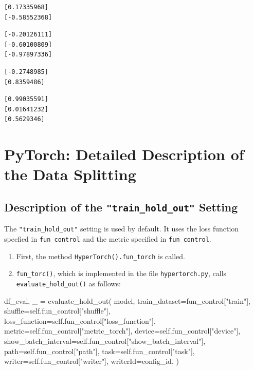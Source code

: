 \documentclass[
  letterpaper,
  DIV=11,
  numbers=noendperiod]{scrreprt}
\newenvironment{Shaded}{\begin{snugshade}}{\end{snugshade}}
\newcommand{\NormalTok}[1]{\textcolor[rgb]{0.00,0.23,0.31}{#1}}
\providecommand{\tightlist}{%
  \setlength{\itemsep}{0pt}\setlength{\parskip}{0pt}}\usepackage{longtable,booktabs,array}
\begin{document}
\begin{verbatim}
[0.17335968]
[-0.58552368]
\end{verbatim}

\begin{verbatim}
[-0.20126111]
[-0.60100809]
[-0.97897336]
\end{verbatim}

\begin{verbatim}
[-0.2748985]
[0.8359486]
\end{verbatim}

\begin{verbatim}
[0.99035591]
[0.01641232]
[0.5629346]
\end{verbatim}

\newpage{}

\hypertarget{sec-detailed-data-splitting}{%
\section{PyTorch: Detailed Description of the Data
Splitting}\label{sec-detailed-data-splitting}}

\hypertarget{description-of-the-train_hold_out-setting}{%
\subsection{\texorpdfstring{Description of the
\texttt{"train\_hold\_out"}
Setting}{Description of the "train\_hold\_out" Setting}}\label{description-of-the-train_hold_out-setting}}

The \texttt{"train\_hold\_out"} setting is used by default. It uses the
loss function specfied in \texttt{fun\_control} and the metric specified
in \texttt{fun\_control}.

\begin{enumerate}
\def\labelenumi{\arabic{enumi}.}
\tightlist
\item
  First, the method \texttt{HyperTorch().fun\_torch} is called.
\item
  \texttt{fun\_torc()}, which is implemented in the file
  \texttt{hypertorch.py}, calls \texttt{evaluate\_hold\_out()} as
  follows:
\end{enumerate}

\begin{Shaded}
\begin{Highlighting}[]
\NormalTok{df\_eval, \_ = evaluate\_hold\_out(}
\NormalTok{    model,}
\NormalTok{    train\_dataset=fun\_control["train"],}
\NormalTok{    shuffle=self.fun\_control["shuffle"],}
\NormalTok{    loss\_function=self.fun\_control["loss\_function"],}
\NormalTok{    metric=self.fun\_control["metric\_torch"],}
\NormalTok{    device=self.fun\_control["device"],}
\NormalTok{    show\_batch\_interval=self.fun\_control["show\_batch\_interval"],}
\NormalTok{    path=self.fun\_control["path"],}
\NormalTok{    task=self.fun\_control["task"],}
\NormalTok{    writer=self.fun\_control["writer"],}
\NormalTok{    writerId=config\_id,}
\NormalTok{)}
\end{Highlighting}
\end{Shaded}
\end{document}
